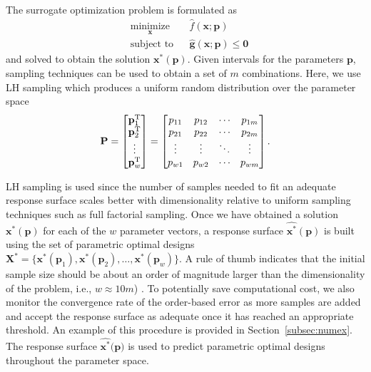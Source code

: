 The surrogate optimization problem is formulated as
\begin{equation}
	\begin{aligned}
		& \underset{\mathbf{x}}{\text{minimize}}
		& & \hat{f}(\mathbf{x};{\mathbf{p}})\\
		& \text{subject to}
		& & \hat{\mathbf{g}}(\mathbf{x};{\mathbf{p}}) \le \mathbf{0}
	\end{aligned}
	\label{eq:SBDoptproblem}
\end{equation}
and solved to obtain the solution $\mathbf{x}^*({\mathbf{p}})$. Given intervals for the parameters $\mathbf{p}$, sampling techniques can be used to obtain a set of $m$ combinations. Here, we use \ac{LH} sampling which produces a uniform random distribution over the parameter space \cite{McKay1979}
\begin{equation}
	 {\mathbf{P}} = \begin{bmatrix}
	 	\mathbf{p}_{1}^{\text T} \\ 
	 	\mathbf{p}_{2}^{\text T} \\ 
	 	\vdots \\ 
	 	\mathbf{p}_{w}^{\text T}
	\end{bmatrix} = \begin{bmatrix}
	 	p_{11} & p_{12} & \cdots & p_{1m}\\ 
	 	p_{21} & p_{22} & \cdots & p_{2m}\\ 
	 	\vdots & \vdots & \ddots & \vdots\\ 
	 	p_{w1} & p_{w2} & \cdots & p_{wm}
	\end{bmatrix}.
\end{equation}

\ac{LH} sampling is used since the number of samples needed to fit an adequate response surface scales better with dimensionality relative to uniform sampling techniques such as full factorial sampling. Once we have obtained a solution $\mathbf{x}^*({\mathbf{p}})$ for each of the $w$ parameter vectors, a response surface $\hat{\mathbf{x}^*}(\mathbf{p})$ is built using the set of parametric optimal designs $\mathbf{X}^*=  \{ \mathbf{x}^*(\mathbf{p}_1),\mathbf{x}^*(\mathbf{p}_2),\ldots,\mathbf{x}^*(\mathbf{p}_w) \}$. A rule of thumb indicates that the initial sample size should be about an order of magnitude larger than the dimensionality of the problem, i.e., $w \approx 10m$) \cite{Loeppky2008}. To potentially save computational cost, we also monitor the convergence rate of the order-based error as more samples are added and accept the response surface as adequate once it has reached an appropriate threshold. An example of this procedure is provided in Section~\ref{subsec:numex}. The response surface $\hat{\mathbf{x}^*}(\mathbf{p)}$ is used to predict parametric optimal designs throughout the parameter space.

